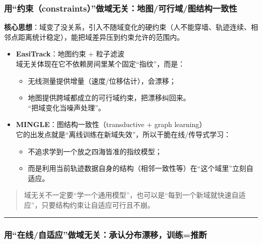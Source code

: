 \documentclass[
]{article}
\begin{document}
\subsubsection{用``约束（constraints）''做域无关：地图/可行域/图结构一致性}\label{ux7528ux7ea6ux675fconstraintsux505aux57dfux65e0ux5173ux5730ux56feux53efux884cux57dfux56feux7ed3ux6784ux4e00ux81f4ux6027}

\textbf{核心思想}：域变了没关系，引入不随域变化的硬约束（人不能穿墙、轨迹连续、相邻点距离统计稳定），能把域差异压到约束允许的范围内。

\begin{itemize}
\item
  \textbf{EasiTrack}：地图约束 + 粒子滤波\\
  域无关体现在它不依赖房间里某个固定``指纹''，而是：

  \begin{itemize}
  \item
    无线测量提供增量（速度/位移估计），会漂移；
  \item
    地图提供跨域都成立的可行域约束，把漂移纠回来。\\
    ``把域变化当噪声处理''。
  \end{itemize}
\item
  \textbf{MINGLE}：图结构一致性（transductive + graph learning）\\
  它的出发点就是``离线训练在新域失效''，所以干脆在线/传导式学习：

  \begin{itemize}
  \item
    不追求学到一个放之四海皆准的指纹模型；
  \item
    而是利用当前轨迹数据自身的结构（相邻一致性等）在``这个域里''立刻自适应。
  \end{itemize}
\end{itemize}

\begin{quote}
域无关不一定要``学一个通用模型''，也可以是``每到一个新域就快速自适应''，只要结构约束让自适应可行且不崩。
\end{quote}

\begin{center}\rule{0.5\linewidth}{0.5pt}\end{center}

\subsubsection{用``在线/自适应''做域无关：承认分布漂移，训练=推断}\label{ux7528ux5728ux7ebfux81eaux9002ux5e94ux505aux57dfux65e0ux5173ux627fux8ba4ux5206ux5e03ux6f02ux79fbux8badux7ec3=ux63a8ux65ad}
\end{document}
